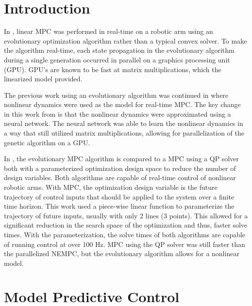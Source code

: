 \documentclass[letterpaper, 10 pt, conference]{ieeeconf}  %
\begin{document}
	
	
	\section{Introduction}
	
	In \cite{hyatt2017real}, linear MPC was performed in real-time on a robotic arm using an evolutionary optimization algorithm rather than a typical convex solver. To make the algorithm real-time, each state propagation in the evolutionary algorithm during a single generation occurred in parallel on a graphics processing unit (GPU). GPU's are known to be fast at matrix multiplications, which the linearized model provided.
	
	The previous work using an evolutionary algorithm was continued in \cite{hyatt2019real} where nonlinear dynamics were used as the model for real-time MPC. The key change in this work from \cite{hyatt2017real} is that the nonlinear dynamics were approximated using a neural network. The neural network was able to learn the nonlinear dynamics in a way that still utilized matrix multiplications, allowing for parallelization of the genetic algorithm on a GPU.
	
	In \cite{hyatt2020parameterized}, the evolutionary MPC algorithm is compared to a MPC using a QP solver both with a parameterized optimization design space to reduce the number of design variables. Both algorithms are capable of real-time control of nonlinear robotic arms. With MPC, the optimization design variable is the future trajectory of control inputs that should be applied to the system over a finite time horizon. This work used a piece-wise linear function to parameterize the trajectory of future inputs, usually with only 2 lines (3 points). This allowed for a significant reduction in the search space of the optimization and thus, faster solve times. With the parameterization, the solve times of both algorithms are capable of running control at over 100 Hz. MPC using the QP solver was still faster than the parallelized NEMPC, but the evolutionary algorithm allows for a nonlinear model.
	
	\section{Model Predictive Control}
	
\end{document}
